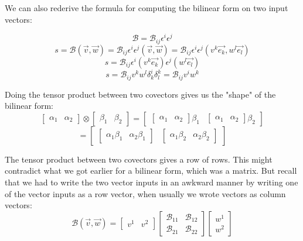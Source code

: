 \documentclass{report}
\begin{document}
We can also rederive the formula for computing the bilinear form on two input vectors:

$$ \mathcal{B} = \mathcal{B}_{ij} \epsilon^i \epsilon^j $$ 
$$ s = \mathcal{B}\left( \vec{v}, \vec{w} \right) = \mathcal{B}_{ij} \epsilon^i \epsilon^j \left( \vec{v}, \vec{w} \right) = \mathcal{B}_{ij} \epsilon^i \epsilon^j \left(v^k \vec{e_k}, w^l \vec{e_l} \right) $$ 
$$ s = \mathcal{B}_{ij} \epsilon^i \left( v^k \vec{e_k} \right) \epsilon^j \left( w^l \vec{e_l} \right) $$ 
$$ s = \mathcal{B}_{ij} v^k w^l \delta_k^i \delta_l^k = \mathcal{B}_{ij} v^i w^k$$ 

Doing the tensor product between two covectors gives us the "shape" of the bilinear form:
$$ \begin{bmatrix} \alpha_1 & \alpha_2 \end{bmatrix} \otimes \begin{bmatrix} \beta_1 & \beta_2 \end{bmatrix} = \begin{bmatrix} \begin{bmatrix} \alpha_1 & \alpha_2 \end{bmatrix} \beta_1 & \begin{bmatrix} \alpha_1 & \alpha_2 \end{bmatrix} \beta_2  \end{bmatrix}  $$ 
$$ = \begin{bmatrix} \begin{bmatrix} \alpha_1 \beta_1 & \alpha_2 \beta_1 \end{bmatrix} & \begin{bmatrix} \alpha_1 \beta_2 & \alpha_2 \beta_2 \end{bmatrix}  \end{bmatrix}  $$ 

The tensor product between two covectors gives a row of rows. This might contradict what we got earlier for a bilinear form, which was a matrix. But recall that we had to write the two vector inputs in an awkward manner by writing one of the vector inputs as a row vector, when usually we wrote vectors as column vectors:
$$ \mathcal{B}\left( \vec{v}, \vec{w} \right) = \begin{bmatrix} v^1 & v^2 \end{bmatrix} \begin{bmatrix} \mathcal{B}_{11} & \mathcal{B}_{12} \\ \mathcal{B}_{21} & \mathcal{B}_{22} \end{bmatrix} \begin{bmatrix} w^1 \\ w^2 \end{bmatrix}  $$ 
\end{document}
